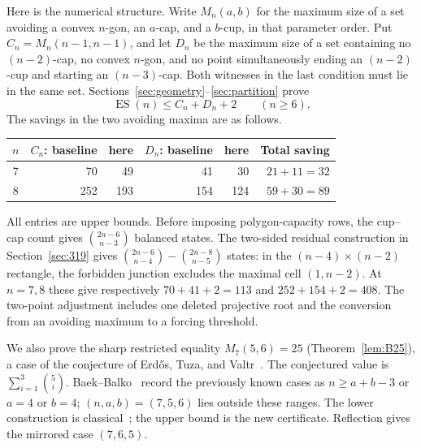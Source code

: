 \documentclass[11pt]{amsart}
\numberwithin{equation}{section}
\theoremstyle{definition}
\theoremstyle{remark}
\DeclareMathOperator{\ES}{ES}
\begin{document}
Here is the numerical structure. Write $M_n(a,b)$ for the maximum size
of a set avoiding a convex $n$-gon, an $a$-cap, and a $b$-cup, in that
parameter order. Put $C_n=M_n(n-1,n-1)$, and let $D_n$ be the maximum
size of a set containing no $(n-2)$-cap, no convex $n$-gon, and no point
simultaneously ending an $(n-2)$-cup and starting an $(n-3)$-cap.
Both witnesses in the last condition must lie in the same set.
Sections~\ref{sec:geometry}--\ref{sec:partition} prove
\begin{equation}\label{eq:bridge}
 \ES(n)\le C_n+D_n+2\qquad(n\ge6).
\end{equation}
The savings in the two avoiding maxima are as follows.
\begin{center}
\begin{tabular}{crrrrr}
\toprule
$n$ & $C_n$: baseline & here & $D_n$: baseline & here & Total saving\\
\midrule
7 & 70 & 49 & 41 & 30 & $21+11=32$\\
8 & 252 & 193 & 154 & 124 & $59+30=89$\\
\bottomrule
\end{tabular}
\end{center}
All entries are upper bounds. Before imposing polygon-capacity rows,
the cup--cap count gives $\binom{2n-6}{n-3}$ balanced states.
The two-sided residual construction in Section~\ref{sec:319} gives
$\binom{2n-6}{n-4}-\binom{2n-8}{n-5}$ states: in the
$(n-4)\times(n-2)$ rectangle, the forbidden junction excludes the
maximal cell $(1,n-2)$. At $n=7,8$ these give respectively
$70+41+2=113$ and $252+154+2=408$.
The two-point adjustment includes one deleted projective root and the
conversion from an avoiding maximum to a forcing threshold.

We also prove the sharp restricted equality $M_7(5,6)=25$
(Theorem~\ref{lem:B25}), a case of the conjecture of
Erd\H{o}s, Tuza, and Valtr~\cite{ETV}. The conjectured value is
$\sum_{i=1}^{3}\binom5i$. Baek--Balko~\cite[Section~2.1]{BB}
record the previously known cases as $n\ge a+b-3$ or $a=4$ or $b=4$;
$(n,a,b)=(7,5,6)$ lies outside these ranges. The lower construction is
classical~\cite{ES61,ETV}; the upper bound is the new certificate.
Reflection gives the mirrored case $(7,6,5)$.
\end{document}
